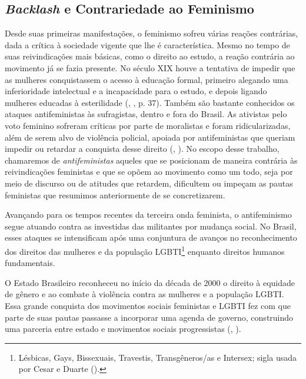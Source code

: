 \documentclass[
	12pt,				%
	openright,			%
	twoside,			%
	a4paper,			%
	english,			%
	brazil				%
	]{abntex2}
\begin{document}
 \subsection{\emph{Backlash} e Contrariedade ao Feminismo}
 Desde suas primeiras manifestações, o feminismo sofreu várias reações contrárias, dada a crítica à sociedade vigente que lhe é característica. Mesmo no tempo de suas reivindicações mais básicas, como o direito ao estudo, a reação contrária ao movimento já se fazia presente. No século XIX houve a tentativa de impedir que as mulheres conquistassem o acesso à educação formal, primeiro alegando uma inferioridade intelectual e a incapacidade para o estudo, e depois ligando mulheres educadas à esterilidade (, \citeyear{cruz2015}, p. 37). Também são bastante conhecidos os ataques antifeministas às sufragistas, dentro e fora do Brasil. As ativistas pelo voto feminino sofreram críticas por parte de moralistas e foram ridicularizadas, além de serem alvo de violência policial, apoiada por antifeministas que queriam impedir ou retardar a conquista desse direito (, \citeyear{alves2019}). No escopo desse trabalho, chamaremos de \emph{antifeministas} aqueles que se posicionam de maneira contrária às reivindicações feministas e que se opõem ao movimento como um todo, seja por meio de discurso ou de atitudes que retardem, dificultem ou impeçam as pautas feministas que resumimos anteriormente de se concretizarem.

 Avançando para os tempos recentes da terceira onda feminista, o antifeminismo segue atuando contra as investidas das militantes por mudança social. No Brasil, esses ataques se intensificam após uma conjuntura de avanços no reconhecimento dos direitos das mulheres e da população LGBTI\footnote{Lésbicas, Gays, Bissexuais, Travestis, Transgêneros/as e Intersex; sigla usada por Cesar e Duarte (\citeyear{cesar2017}).} enquanto direitos humanos fundamentais. 

 O Estado Brasileiro reconheceu no início da década de 2000 o direito à equidade de gênero e ao combate à violência contra as mulheres e a população LGBTI. Essa grande conquista dos movimentos sociais feministas e LGBTI fez com que parte de suas pautas passasse a incorporar uma agenda de governo, construindo uma parceria entre estado e movimentos sociais progressistas (, \citeyear{cesar2017}).
 
\end{document}
